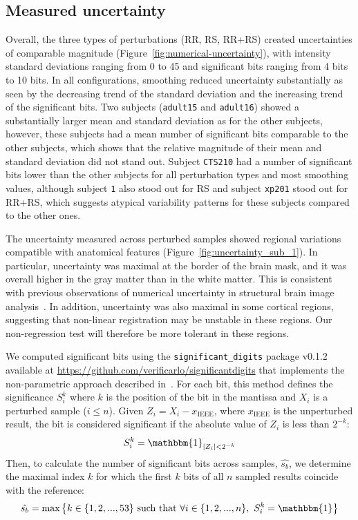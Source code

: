 \documentclass{article}
\begin{document}
\subsection{Measured uncertainty}

Overall, the three types of perturbations (RR, RS, RR+RS) created uncertainties of comparable magnitude (Figure~\ref{fig:numerical-uncertainty}), with intensity standard deviations ranging from 0 to 45 and significant bits ranging from 4 bits to 10 bits. In all configurations, smoothing reduced uncertainty substantially as seen by the decreasing trend of the standard deviation and the increasing trend of the significant bits. Two subjects (\texttt{adult15} and \texttt{adult16}) showed a substantially larger mean and standard deviation as for the other subjects, however, these subjects had a mean number of significant bits comparable to the other subjects, which shows that the relative magnitude of their mean and standard deviation did not stand out. 
Subject \texttt{CTS210} had a number of significant bits lower than the other subjects for all perturbation types and most smoothing values, although subject \texttt{1} also stood out for RS and subject \texttt{xp201} stood out for RR+RS, which suggests atypical variability patterns for these subjects compared to the other ones.

The uncertainty measured across perturbed samples showed regional variations compatible with anatomical features (Figure~\ref{fig:uncertainty_sub_1}). In particular, uncertainty was maximal at the border of the brain mask, and it was overall higher in the gray matter than in the white matter. This is consistent with previous observations of numerical uncertainty in structural brain image analysis~\cite{salari2021accurate}. In addition, uncertainty was also maximal in some cortical regions, suggesting that non-linear registration may be unstable in these regions. Our non-regression test will therefore be more tolerant in these regions.

We computed significant bits using the \texttt{significant\_digits} package v0.1.2 available at \url{https://github.com/verificarlo/significantdigits} that implements the non-parametric approach described in~\cite{sohier2021confidence}. For each bit, this method defines the significance $S^k_i$ where \(k\) is the position of the bit in the mantissa and $X_i$ is a perturbed sample  ($i \leq n$).
Given $Z_i=X_i-x_\mathrm{IEEE}$, where $x_\mathrm{IEEE}$ is the unperturbed result, the bit is considered significant if the absolute value of $Z_i$ is less than $2^{-k}$:
\[S^k_i = \mathbbm{1}_{|Z_i |<2^{-k}}\]
Then, to calculate the number of significant bits across samples, $\hat{s_b}$, we determine the maximal index \(k\) for which the first \(k\) bits of all \(n\) sampled results coincide with the reference:
\[\hat{s_{b}} = \textnormal{max} \left\{ k \in \{1,2,...,53\} \textnormal{ such that } \forall i \in \{1,2,...,n\},\  S^{k}_{i}=\mathbbm{1}\right\} \] 
\end{document}
